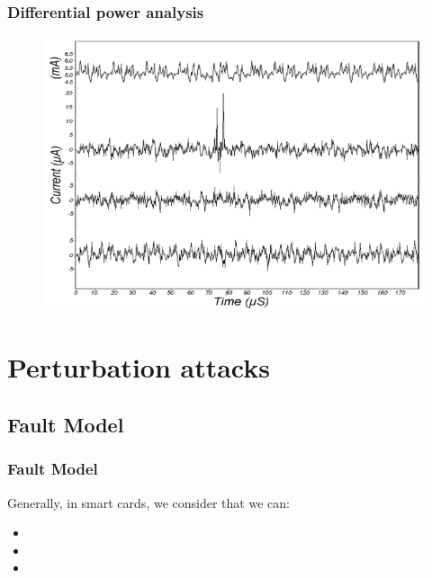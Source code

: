 \documentclass{beamer}
\begin{document}
\begin{frame}
    \frametitle{Differential power analysis}
    \begin{figure}
        \centering
        \includegraphics[scale=0.5]{img/dpa2.png}
    \end{figure}
\end{frame}

\section{Perturbation attacks}
    \subsection{Fault Model}

    \begin{frame}
        \frametitle{Fault Model}
            Generally, in smart cards, we consider that we can:
            \begin{itemize}
                \item {}
                \item {}
                \item {}
            \end{itemize}
    \end{frame}
\end{document}
